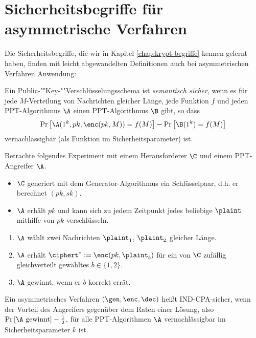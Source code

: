 \section{Sicherheitsbegriffe für asymmetrische Verfahren} Die
Sicherheitsbegriffe, die wir in Kapitel \ref{chap:krypt-begriffe} kennen
gelernt haben, finden mit leicht abgewandelten Definitionen auch bei
asymmetrischen Verfahren Anwendung:

\begin{definition} Ein
  Pub\-lic-""Key-""Ver\-schlüs\-sel\-ungs\-sche\-ma ist \textit{semantisch
    sicher}, wenn es für jede $M$-Verteilung von Nachrichten gleicher Länge,
  jede Funktion $f$ und jeden PPT-Algorithmus $\A$ einen PPT-Algorithmus
  $\B$ gibt, so dass
  \begin{equation*} \Pr\left[\A(1^k, pk, \enc(pk, M)) = f(M)\right] -
    \Pr\left[\B(1^k) = f(M)\right]
  \end{equation*} vernachlässigbar (als Funktion im Sicherheitsparameter)
  ist.
\end{definition}

\begin{definition}\indexINDCPA Betrachte folgendes Experiment mit
  einem Herausforderer $\C$ und einem PPT-Angreifer $\A$.
  \begin{itemize}
  \item $\C$ generiert mit dem Generator-Algorithmus ein Schlüsselpaar,
    d.h. er berechnet $(pk, sk)$.
  \item $\A$ erhält $pk$ und kann sich zu jedem Zeitpunkt jedes
    beliebige $\plaint$ mithilfe von $pk$ verschlüsseln.
  \end{itemize}
  \begin{enumerate}
  \item $\A$ wählt zwei Nachrichten $\plaint_1$, $\plaint_2$ gleicher
    Länge.
  \item $\A$ erhält $\ciphert^{*} := \enc(pk, \plaint_{b})$ für ein von
    $\C$ zufällig gleichverteilt gewähltes $b \in \{1, 2\}$.
  \item $\A$ gewinnt, wenn er $b$ korrekt errät.
  \end{enumerate} Ein asymmetrisches Verfahren $(\gen, \enc, \dec)$
  heißt IND-CPA-sicher, wenn der Vorteil des Angreifers gegenüber dem
  Raten einer Lösung, also $\Pr \left[ \A \textnormal{ gewinnt} \right] -
  \frac{1}{2}$, für alle PPT-Algorithmen $\A$ vernachlässigbar im
  Sicherheitsparameter $k$ ist.
\end{definition}

